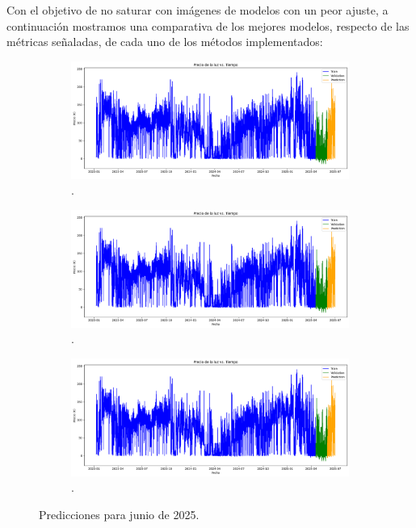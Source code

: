 Con el objetivo de no saturar con imágenes de modelos con un peor ajuste, a continuación mostramos una comparativa de los mejores modelos, respecto de las métricas señaladas, de cada uno de los métodos implementados:
\begin{figure}[H]
\centering
\begin{subfigure}[b]{0.3\textwidth}
\centering
\includegraphics[width=\textwidth]{figuras/historico_precios.png}
\caption[Predicción mediante SARIMAX]{.}
\label{PrediccionSarimax}
\end{subfigure}
\begin{subfigure}[b]{0.3\textwidth}
\centering
\includegraphics[width=\textwidth]{figuras/historico_precios.png}
\caption[Predicción mediante XGBoost]{.}
\label{PrediccionXGBoost}
\end{subfigure}
\begin{subfigure}[b]{0.3\textwidth}
\centering
\includegraphics[width=\textwidth]{figuras/historico_precios.png}
\caption[Predicción mediante TFT]{.}
\label{PrediccionTFT}
\end{subfigure}
\caption{Predicciones para junio de 2025.}
\label{PrediccionesLuz}
\end{figure}
%
